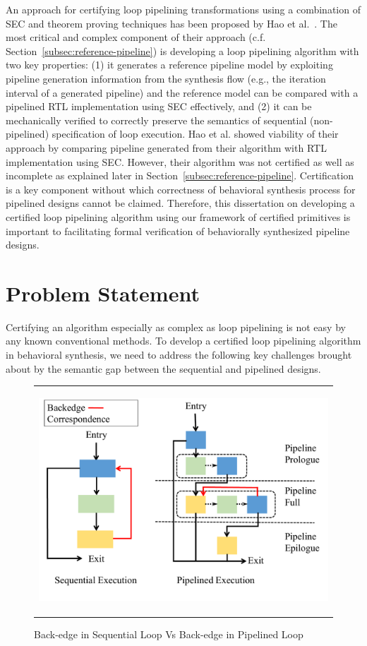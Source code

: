 An approach for certifying loop pipelining transformations using a combination of SEC and 
theorem proving techniques has been proposed by Hao et al.~\cite{hrx:dac-12}. The most critical and complex
component of their approach (c.f. Section~\ref{subsec:reference-pipeline}) is developing
a loop pipelining algorithm with two key properties: (1) it generates a reference pipeline model 
by exploiting pipeline generation information from the synthesis flow (e.g., the iteration interval 
of a generated pipeline) and the reference model can be compared with a pipelined RTL 
implementation using SEC effectively, and (2) it can be mechanically verified to correctly preserve the semantics of
sequential (non-pipelined) specification of loop execution. Hao et al. showed viability of 
their approach by comparing pipeline generated from their algorithm with RTL implementation 
using SEC. However, their algorithm was not certified as well as incomplete as explained 
later in Section~\ref{subsec:reference-pipeline}. Certification is a key component 
without which correctness of behavioral synthesis process for pipelined designs cannot be claimed.
Therefore, this dissertation on 
developing a certified loop pipelining algorithm using our framework of certified 
primitives is important to facilitating formal verification of behaviorally synthesized
 pipeline designs.

\section{Problem Statement}
Certifying an algorithm especially as complex as loop pipelining is not easy by any known conventional methods. To develop a certified loop pipelining algorithm in behavioral synthesis, we need to address the following key challenges brought about by the semantic gap between the sequential and pipelined designs.

\begin{figure}[t!]
\begin{center}
\begin{tabular}{c}
\includegraphics[height=3.3in]{fig-proposal/seq-and-pp}
\end{tabular}
\end{center}
\caption{Back-edge in Sequential Loop Vs Back-edge in Pipelined Loop}
\label{fig:seq-and-pp}
\end{figure}

